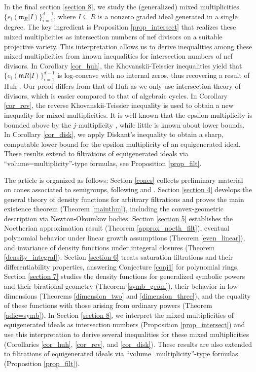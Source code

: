 \documentclass[12pt,a4paper]{amsart}
\theoremstyle{plain}
\theoremstyle{definition}
\numberwithin{equation}{theorem}
\begin{document}
In the final section \ref{section 8}, we study the (generalized) mixed multiplicities $\{e_i(\mathfrak{m}_R\vert I)\}_{i=1}^{d-1}$, where $I\subseteq R$ is a nonzero graded ideal generated in a single degree. The key ingredient is Proposition \ref{prop_intersect} that realizes these mixed multiplicities as intersection numbers of nef divisors on a suitable projective variety. This interpretation allows us to derive inequalities among these mixed multiplicities from known inequalities for intersection numbers of nef divisors. In Corollary \ref{cor_huh}, the Khovanskii-Teissier inequalities \cite[Section 1.6.A]{Laz04a} yield that $\{e_i(\mathfrak{m}R\vert I)\}_{i=1}^{d-1}$ is log-concave with no internal zeros, thus recovering a result of Huh \cite{Huh12}. Our proof differs from that of Huh as we only use intersection theory of divisors, which is easier compared to that of algebraic cycles. In Corollary \ref{cor_rev}, the reverse Khovanskii-Teissier inequality \cite{JL23} is used to obtain a new inequality for mixed multiplicities. It is well-known that the epsilon multiplicity is bounded above by the $j$-multiplicity \cite{UV08, UV11}, while little is known about lower bounds. In Corollary \ref{cor_disk}, we apply Diskant's inequality \cite{BFJ09} to obtain a sharp, computable lower bound for the epsilon multiplicity of an equigenerated ideal. These results extend to filtrations of equigenerated ideals via ``volume=multiplicity''-type formulas, see Proposition \ref{prop_filt}.

The article is organized as follows: Section \ref{cones} collects preliminary material on cones associated to semigroups, following \cite{LM09} and \cite{KK12}. Section \ref{section 4} develops the general theory of density functions for arbitrary filtrations and proves the main existence theorem (Theorem \ref{mainthm}), including the convex-geometric description via Newton-Okounkov bodies. Section \ref{section 5} establishes the Noetherian approximation result (Theorem \ref{approx_noeth_filt}), eventual polynomial behavior under linear growth assumptions (Theorem \ref{even_linear}), and invariance of density functions under integeral closures (Theorem \ref{density_integral}). Section \ref{section 6} treats saturation filtrations and their differentiability properties, answering Conjecture \ref{conj1} for polynomial rings. Section \ref{section 7} studies the density functions for generalized symbolic powers and their birational geometry (Theorem \ref{symb_geom}), their behavior in low dimensions (Theorems \ref{dimension_two} and \ref{dimension_three}), and the equality of these functions with those arising from ordinary powers (Theorem \ref{adic=symb}). In Section \ref{section 8}, we interpret the mixed multiplicities of equigenerated ideals as intersection numbers (Proposition \ref{prop_intersect}) and use this interpretation to derive several inequalities for these mixed multiplicities (Corollaries \ref{cor_huh}, \ref{cor_rev}, and \ref{cor_disk}). These results are also extended to filtrations of equigenerated ideals via ``volume=multiplicity''-type formulas (Proposition \ref{prop_filt}).
\end{document}
